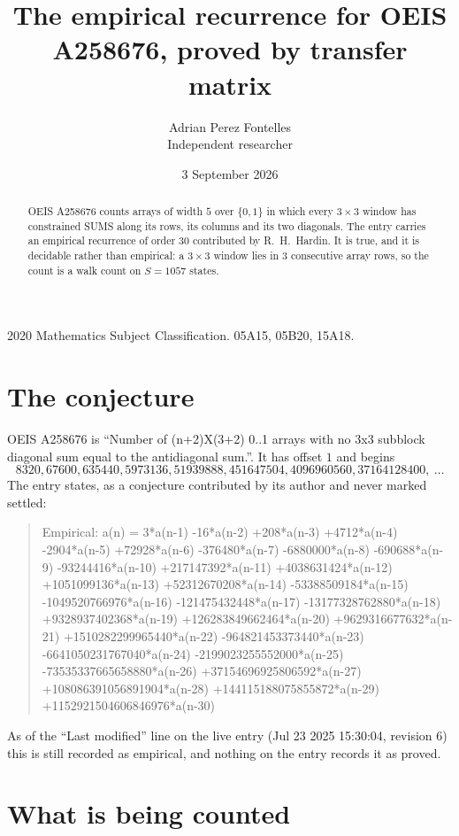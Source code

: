 \documentclass[11pt,a4paper]{article}
\title{The empirical recurrence for OEIS A258676, proved by transfer matrix}
\author{Adrian Perez Fontelles\\ \small Independent researcher}
\date{3 September 2026}
\theoremstyle{plain}
\theoremstyle{definition}
\begin{document}
\maketitle

\begin{abstract}
OEIS A258676 counts arrays of width $5$ over $\{0,1\}$ in which every $3\times3$ window has
constrained SUMS along its rows, its columns and its two diagonals. The entry carries an
empirical recurrence of order $30$ contributed by R.~H.~Hardin. It is true, and it is
decidable rather than empirical: a $3\times3$ window lies in $3$ consecutive array rows,
so the count is a walk count on $S=1057$ states.
\end{abstract}

\noindent\small 2020 Mathematics Subject Classification. 05A15, 05B20, 15A18.\normalsize

\section{The conjecture}

OEIS A258676 is ``Number of (n+2)X(3+2) 0..1 arrays with no 3x3 subblock diagonal sum equal to the antidiagonal sum.''. It has offset $1$ and begins
\[
8320, 67600, 635440, 5973136, 51939888, 451647504, 4096960560, 37164128400,\ \dots
\]
The entry states, as a conjecture contributed by its author and never marked settled:
\begin{quote}
Empirical: a(n) = 3*a(n-1) -16*a(n-2) +208*a(n-3) +4712*a(n-4) -2904*a(n-5) +72928*a(n-6) -376480*a(n-7) -6880000*a(n-8) -690688*a(n-9) -93244416*a(n-10) +217147392*a(n-11) +4038631424*a(n-12) +1051099136*a(n-13) +52312670208*a(n-14) -53388509184*a(n-15) -1049520766976*a(n-16) -121475432448*a(n-17) -13177328762880*a(n-18) +9328937402368*a(n-19) +126283849662464*a(n-20) +9629316677632*a(n-21) +1510282299965440*a(n-22) -964821453373440*a(n-23) -6641050231767040*a(n-24) -2199023255552000*a(n-25) -73535337665658880*a(n-26) +37154696925806592*a(n-27) +108086391056891904*a(n-28) +144115188075855872*a(n-29) +1152921504606846976*a(n-30)
\end{quote}
As of the ``Last modified'' line on the live entry (Jul 23 2025 15:30:04, revision 6) this is still
recorded as empirical, and nothing on the entry records it as proved.

\section{What is being counted}
\end{document}
